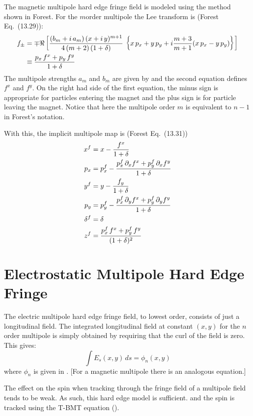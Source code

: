 The magnetic multipole hard edge fringe field is modeled using the method shown in
Forest\cite{b:forest}. For the $m$\Th order multipole the Lee transform 
is (Forest Eq.~(13.29)):
\begin{align}
  f_\pm &= \mp \Re \left[ \frac{(b_m + i \, a_m) \, 
    (x + i \, y)^{m+1}}{4 \, (m + 2) \, (1 + \delta)} \,
    \left\{ x \, p_x + y \, p_y + i \frac{m+3}{m+1} 
    (x \, p_x - y \, p_y) \right\} \right] \nonumber \\
  &\equiv \frac{p_x \, f^x + p_y \, f^y}{1 + \delta}
\end{align}
The multipole strengths $a_m$ and $b_m$ are given by 
and the second equation defines $f^x$ and $f^y$. On the right had side of the first
equation, the minus sign is appropriate for particles entering the magnet and the
plus sign is for particle leaving the magnet.
Notice that here the multipole order $m$ is equivalent to $n-1$ in Forest's notation.

With this, the implicit multipole map is (Forest Eq.~(13.31))
\begin{align}
  x^f &= x - \frac{f^x}{1 + \delta} \nonumber \\
  p_x &= p_x^f - \frac{p_x^f \, \partial_x f^x + p_y^f \, \partial_x f^y}{1 + \delta} \nonumber \\
  y^f &= y - \frac{f_y}{1 + \delta} \\
  p_y &= p_y^f - \frac{p_x^f \, \partial_y f^x + p_y^f \, \partial_y f^y}{1 + \delta} \nonumber \\
  \delta^f &= \delta \nonumber \\
  z^f &=\frac{p_x^f \, f^x + p_y^f \, f^y}{(1 + \delta)^2} \nonumber
\end{align}

\section{Electrostatic Multipole Hard Edge Fringe}
\label{s:spin.hard.fringe}

The electric multipole hard edge fringe field, to lowest order, consists of just a
longitudinal field. The integrated longitudinal field at constant $(x,y)$ for the $n$\Th
order multipole is simply obtained by requiring that the curl of the field is zero.
This gives:
\begin{equation}
  \int E_s(x,y) \, ds = \phi_n(x,y)
\end{equation}
where $\phi_n$ is given in . [For a magnetic multipole there is an analogous
equation.]

The effect on the spin when tracking through the fringe field of a multipole field tends
to be weak. As such, this hard edge model is sufficient.  and the spin is tracked using
the T-BMT equation ().
